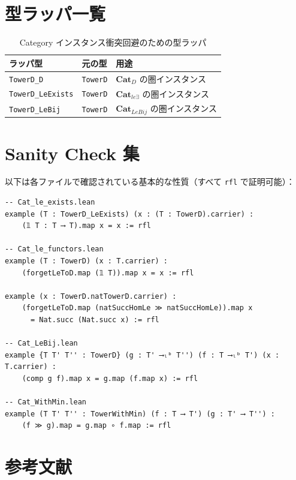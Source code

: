 \documentclass{ltjsarticle}
\theoremstyle{definition}
\newcommand{\catD}{\mathbf{Cat}_D}
\newcommand{\catleexists}{\mathbf{Cat}_{le\exists}}
\newcommand{\catlebij}{\mathbf{Cat}_{LeBij}}
\begin{document}

\appendix

\section{型ラッパ一覧}

\begin{table}[htbp]
\centering
\caption{Category インスタンス衝突回避のための型ラッパ}
\begin{tabular}{lll}
\toprule
ラッパ型 & 元の型 & 用途 \\
\midrule
\texttt{TowerD\_D} & \texttt{TowerD} & $\catD$ の圏インスタンス \\
\texttt{TowerD\_LeExists} & \texttt{TowerD} & $\catleexists$ の圏インスタンス \\
\texttt{TowerD\_LeBij} & \texttt{TowerD} & $\catlebij$ の圏インスタンス \\
\bottomrule
\end{tabular}
\end{table}

\section{Sanity Check 集}

以下は各ファイルで確認されている基本的な性質（すべて \texttt{rfl} で証明可能）：

\begin{lstlisting}[caption=Sanity checks]
-- Cat_le_exists.lean
example (T : TowerD_LeExists) (x : (T : TowerD).carrier) :
    (𝟙 T : T ⟶ T).map x = x := rfl

-- Cat_le_functors.lean
example (T : TowerD) (x : T.carrier) :
    (forgetLeToD.map (𝟙 T)).map x = x := rfl

example (x : TowerD.natTowerD.carrier) :
    (forgetLeToD.map (natSuccHomLe ≫ natSuccHomLe)).map x 
      = Nat.succ (Nat.succ x) := rfl

-- Cat_LeBij.lean
example {T T' T'' : TowerD} (g : T' ⟶ₗᵇ T'') (f : T ⟶ₗᵇ T') (x : T.carrier) :
    (comp g f).map x = g.map (f.map x) := rfl

-- Cat_WithMin.lean
example (T T' T'' : TowerWithMin) (f : T ⟶ T') (g : T' ⟶ T'') :
    (f ≫ g).map = g.map ∘ f.map := rfl
\end{lstlisting}

\section{参考文献}
\end{document}
